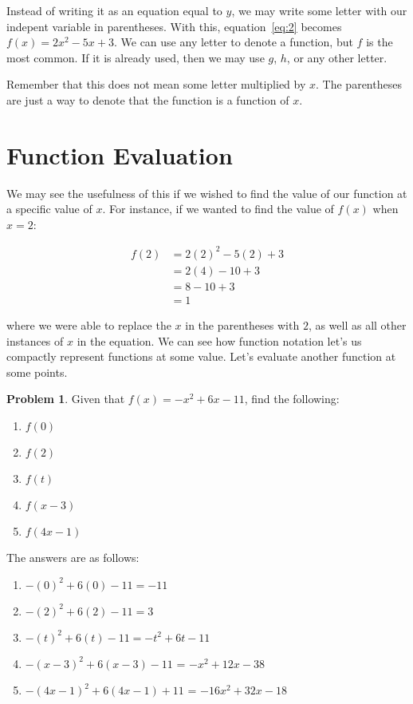 \documentclass[12pt]{article}
\theoremstyle{definition}
\newtheorem{problem}{Problem}
\begin{document}
Instead of writing it as an equation equal to $y$, we may write some letter with our indepent variable in parentheses.
With this, equation~\eqref{eq:2} becomes $f(x) = 2x^2-5x+3$.
We can use any letter to denote a function, but $f$ is the most common.
If it is already used, then we may use $g$, $h$, or any other letter.

Remember that this does not mean some letter multiplied by $x$.
The parentheses are just a way to denote that the function is a function of $x$.

\section{Function Evaluation}
We may see the usefulness of this if we wished to find the value of our function at a specific value of $x$.
For instance, if we wanted to find the value of $f(x)$ when $x = 2$:

\begin{align*}
    f(2) & = 2(2)^2-5(2)+3 \\
         & = 2(4)-10+3     \\
         & = 8-10+3        \\
         & = 1
\end{align*}

where we were able to replace the $x$ in the parentheses with $2$, as well as all other instances of $x$ in the equation.
We can see how function notation let's us compactly represent functions at some value.
Let's evaluate another function at some points.


\begin{problem}
Given that $f(x) = -x^2+6x-11$, find the following:

\begin{enumerate}
    \item $f(0)$
    \item $f(2)$
    \item $f(t)$
    \item $f(x-3)$
    \item $f(4x-1)$
\end{enumerate}
\end{problem}

The answers are as follows:

\begin{enumerate}
    \item $-(0)^2+6(0)-11 = -11$
    \item $-(2)^2+6(2)-11 = 3$
    \item $-(t)^2+6(t)-11 = -t^2+6t-11$
    \item $-(x-3)^2+6(x-3)-11$ = $-x^2+12x-38$
    \item $-(4x-1)^2+6(4x-1)+11$ = $-16x^2+32x-18$
\end{enumerate}
\end{document}
